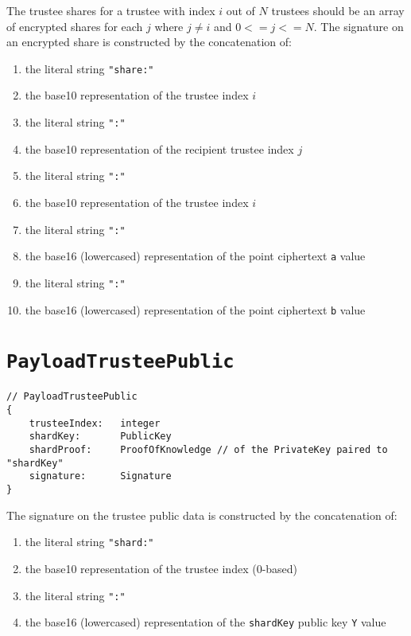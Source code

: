 The trustee shares for a trustee with index $i$ out of $N$ trustees should be an array of encrypted shares for each $j$ where $j \neq i$ and $0 <= j <= N$. The signature on an encrypted share is constructed by the concatenation of:

\begin{enumerate}
    \item the literal string \lstinline[style=ES6]{"share:"}
    \item the base10 representation of the trustee index $i$
    \item the literal string \lstinline[style=ES6]{":"}
    \item the base10 representation of the recipient trustee index $j$
    \item the literal string \lstinline[style=ES6]{":"}
    \item the base10 representation of the trustee index $i$
    \item the literal string \lstinline[style=ES6]{":"}
    \item the base16 (lowercased) representation of the point ciphertext \texttt{a} value
    \item the literal string \lstinline[style=ES6]{":"}
    \item the base16 (lowercased) representation of the point ciphertext \texttt{b} value
\end{enumerate}

\section*{\texttt{PayloadTrusteePublic}}
\label{dt:payload:public}
\begin{lstlisting}[style=ES6]
// PayloadTrusteePublic
{
    trusteeIndex:   integer
    shardKey:       PublicKey
    shardProof:     ProofOfKnowledge // of the PrivateKey paired to "shardKey"
    signature:      Signature
}
\end{lstlisting}

The signature on the trustee public data is constructed by the concatenation of:

\begin{enumerate}
    \item the literal string \lstinline[style=ES6]{"shard:"}
    \item the base10 representation of the trustee index (0-based)
    \item the literal string \lstinline[style=ES6]{":"}
    \item the base16 (lowercased) representation of the \texttt{shardKey} public key \texttt{Y} value
\end{enumerate}

